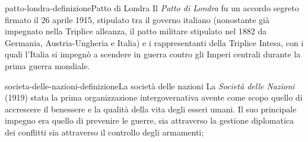 \documentclass[preview]{standalone}
\begin{document}

\begin{snippetdefinition}{patto-londra-definizione}{Patto di Londra}
    Il \textit{Patto di Londra} fu un accordo segreto firmato il
    26 aprile 1915, stipulato tra il governo italiano
    (nonostante già impegnato nella Triplice alleanza,
    il patto militare stipulato nel 1882 da Germania,
    Austria-Ungheria e Italia) e i rappresentanti della Triplice Intesa,
    con i quali l'Italia si impegnò a scendere in guerra contro gli Imperi centrali
    durante la prima guerra mondiale. 
\end{snippetdefinition}

\begin{snippetdefinition}{societa-delle-nazioni-definizione}{La società delle nazioni}
    La \textit{Società delle Nazioni} (1919)
    stata la prima organizzazione intergovernativa
    avente come scopo quello di accrescere il benessere
    e la qualità della vita degli esseri umani.
    Il suo principale impegno
    era quello di prevenire le guerre,
    sia attraverso la gestione diplomatica dei conflitti
    sia attraverso il controllo degli armamenti; 
\end{snippetdefinition}
\end{document}
